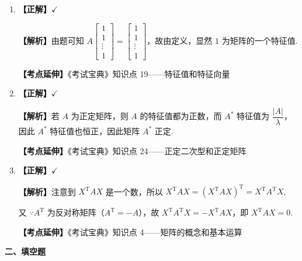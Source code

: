 \documentclass[a4paper,11pt]{ctexart}
\newcommand{\T}{\mathrm{T}}
\begin{document}
\begin{enumerate}[label=\arabic*., leftmargin=2em, itemsep=0.6em, topsep=0.5em]
  \textbf{【考点延伸】}《考试宝典》知识点 4——矩阵的概念和基本运算

  \item \textbf{【正解】}$\checkmark$

  \textbf{【解析】}由题可知 $A \begin{bmatrix} 1 \\ 1 \\ \vdots \\ 1 \end{bmatrix} = \begin{bmatrix} 1 \\ 1 \\ \vdots \\ 1 \end{bmatrix}$，故由定义，显然 $1$ 为矩阵的一个特征值.

  \textbf{【考点延伸】}《考试宝典》知识点 19——特征值和特征向量

  \item \textbf{【正解】}$\checkmark$

  \textbf{【解析】}若 $A$ 为正定矩阵，则 $A$ 的特征值都为正数，而 $A^*$ 特征值为 $\dfrac{|A|}{\lambda}$，因此 $A^*$ 特征值也恒正，因此矩阵 $A^*$ 正定.

  \textbf{【考点延伸】}《考试宝典》知识点 24——正定二次型和正定矩阵

  \item \textbf{【正解】}$\checkmark$

  \textbf{【解析】}注意到 $X^{\T}AX$ 是一个数，所以 $X^{\T}AX = (X^{\T}AX)^{\T} = X^{\T}A^{\T}X$.

  又 $\because A^{\T}$ 为反对称矩阵（$A^{\T} = -A$），故 $X^{\T}A^{\T}X = -X^{\T}AX$，即 $X^{\T}AX = 0$.

  \textbf{【考点延伸】}《考试宝典》知识点 4——矩阵的概念和基本运算
\end{enumerate}

\vspace{0.8em}

\textbf{二、填空题}
\end{document}
